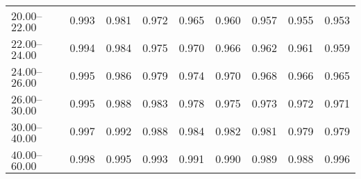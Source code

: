\begin{table}[htp]
\begin{tiny}
\begin{center}
\begin{tabular}{|l|c|c|c|c|c|c|c|c|}
$20.00$--$22.00$ & 0.993 & 0.981 & 0.972 & 0.965 & 0.960 & 0.957 & 0.955 & 0.953  \\
$22.00$--$24.00$ & 0.994 & 0.984 & 0.975 & 0.970 & 0.966 & 0.962 & 0.961 & 0.959  \\
$24.00$--$26.00$ & 0.995 & 0.986 & 0.979 & 0.974 & 0.970 & 0.968 & 0.966 & 0.965  \\
$26.00$--$30.00$ & 0.995 & 0.988 & 0.983 & 0.978 & 0.975 & 0.973 & 0.972 & 0.971  \\
$30.00$--$40.00$ & 0.997 & 0.992 & 0.988 & 0.984 & 0.982 & 0.981 & 0.979 & 0.979  \\
$40.00$--$60.00$ & 0.998 & 0.995 & 0.993 & 0.991 & 0.990 & 0.989 & 0.988 & 0.996  \\
\hline
\end{tabular} 
             \end{center} 
             \end{tiny} 
             \label{tab:sa_offN_psi2s} 
             \end{table}


\clearpage



